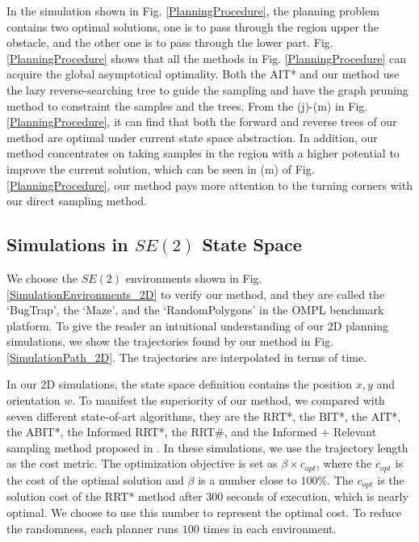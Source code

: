 In the simulation shown in Fig. \ref{PlanningProcedure}, the planning problem contains two optimal solutions, one is to pass through the region upper the obstacle, and the other one is to pass through the lower part.
Fig. \ref{PlanningProcedure} shows that all the methods in Fig. \ref{PlanningProcedure} can acquire the global asymptotical optimality.
Both the AIT* and our method use the lazy reverse-searching tree to guide the sampling and have the graph pruning method to constraint the samples and the trees.
From the (j)-(m) in Fig. \ref{PlanningProcedure}, it can find that both the forward and reverse trees of our method are optimal under current state space abstraction.
In addition, our method concentrates on taking samples in the region with a higher potential to improve the current solution, which can be seen in (m) of Fig. \ref{PlanningProcedure}, our method pays more attention to the turning corners with our direct sampling method.


\subsection{Simulations in $SE(2)$ State Space}



We choose the $SE(2)$ environments shown in Fig. \ref{SimulationEnvironments_2D} to verify our method, and they are called the `BugTrap', the `Maze', and the `RandomPolygons' in the OMPL benchmark platform. 
To give the reader an intuitional understanding of our 2D planning simulations, we show the trajectories found by our method in Fig. \ref{SimulationPath_2D}.
The trajectories are interpolated in terms of time.


In our 2D simulations, the state space definition contains the position $x, y$ and orientation $w$.
To manifest the superiority of our method, we compared with seven different state-of-art algorithms, they are the RRT*, the BIT*, the AIT*, the ABIT*, the Informed RRT*, the RRT\#, and the Informed $+$ Relevant sampling method proposed in \cite{joshi2020relevant}.
In these simulations, we use the trajectory length as the cost metric.
The optimization objective is set as $\beta \times c_{opt}$, where the $c_{opt}$ is the cost of the optimal solution and $\beta$ is a number close to $100\%$.
The $c_{opt}$ is the solution cost of the RRT* method after $300$ seconds of execution, which is nearly optimal. 
We choose to use this number to represent the optimal cost.
To reduce the randomness, each planner runs $100$ times in each environment.



